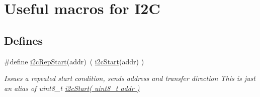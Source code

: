\hypertarget{group___i2_c_m_a_c_r_o_s}{\section{\-Useful macros for \-I2\-C}
\label{group___i2_c_m_a_c_r_o_s}
}
\subsection*{\-Defines}
\begin{DoxyCompactItemize}
\item 
\hypertarget{group___i2_c_m_a_c_r_o_s_gae4d997715a9975eac8684f6e52402a9b}{\#define \hyperlink{group___i2_c_m_a_c_r_o_s_gae4d997715a9975eac8684f6e52402a9b}{i2c\-Rep\-Start}(addr)~( \hyperlink{i2cmaster_8h_a912c175d56be165722ccb59e4049f159}{i2c\-Start}(addr) )}\label{group___i2_c_m_a_c_r_o_s_gae4d997715a9975eac8684f6e52402a9b}

\begin{DoxyCompactList}\small\item\em \-Issues a repeated start condition, sends address and transfer direction \-This is just an alias of uint8\-\_\-t \hyperlink{i2cmaster_8h_a912c175d56be165722ccb59e4049f159}{i2c\-Start( uint8\-\_\-t addr )} \end{DoxyCompactList}\end{DoxyCompactItemize}
